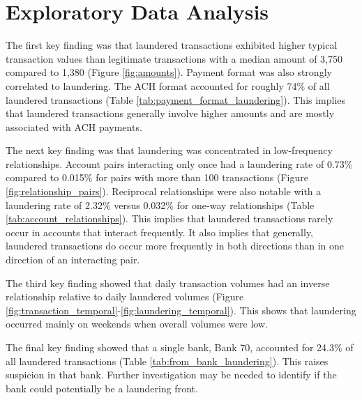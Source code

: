 \section{Exploratory Data Analysis}


The first key finding was that laundered transactions exhibited higher typical transaction values than legitimate transactions with a median amount of 3,750 compared to 1,380 (Figure \ref{fig:amounts}). Payment format was also strongly correlated to laundering. The ACH format accounted for roughly 74\% of all laundered transactions (Table \ref{tab:payment_format_laundering}). This implies that laundered transactions generally involve higher amounts and are mostly associated with ACH payments.

The next key finding was that laundering was concentrated in low-frequency relationships. Account pairs interacting only once had a laundering rate of 0.73\% compared to 0.015\% for pairs with more than 100 transactions (Figure \ref{fig:relationship_pairs}). Reciprocal relationships were also notable with a laundering rate of 2.32\% versus 0.032\% for one-way relationships (Table \ref{tab:account_relationships}). This implies that laundered transactions rarely occur in accounts that interact frequently. It also implies that generally, laundered transactions do occur more frequently in both directions than in one direction of an interacting pair.

The third key finding showed that daily transaction volumes had an inverse relationship relative to daily laundered volumes (Figure \ref{fig:transaction_temporal}-\ref{fig:laundering_temporal}). This shows that laundering occurred mainly on weekends when overall volumes were low. 

\newpage

The final key finding showed that a single bank, Bank 70, accounted for 24.3\% of all laundered transactions (Table \ref{tab:from_bank_laundering}). This raises suspicion in that bank. Further investigation may be needed to identify if the bank could potentially be a laundering front.
